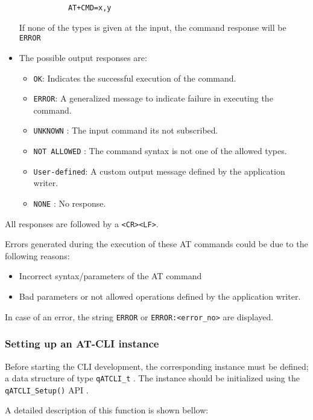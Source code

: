 \begin{itemize}
\begin{itemize}
        \begin{lstlisting}
        AT+CMD=x,y
        \end{lstlisting}
    \end{itemize}
    If none of the types is given at the input, the command response will be \lstinline{ERROR}
    \item The possible output responses are:
    \begin{itemize}
        \item \lstinline{OK}: Indicates the successful execution of the command.
        \item \lstinline{ERROR}: A generalized message to indicate failure in executing the command. 
        \item \lstinline{UNKNOWN} : The input command its not subscribed.
        \item \lstinline{NOT ALLOWED} : The command syntax is not one of the allowed types.
        \item \lstinline{User-defined}: A custom output message defined by the application writer.
        \item \lstinline{NONE} : No response.
    \end{itemize}
\end{itemize}

All responses are followed by a \lstinline{<CR><LF>}.
\medskip

Errors generated during the execution of these AT commands could be due to the following reasons:
\begin{itemize}
    \item Incorrect syntax/parameters of the AT command
    \item Bad parameters or not allowed operations defined by the application writer.
\end{itemize}

In case of an error, the string \lstinline{ERROR} or \lstinline{ERROR:<error_no>} are displayed.

\subsubsection{Setting up an AT-CLI instance}
Before starting the CLI development, the corresponding instance must be defined; a data structure of type \lstinline{qATCLI_t} . 
The instance should be initialized using the \lstinline{qATCLI_Setup()} API .

A detailed description of this function is shown bellow:
\medskip

